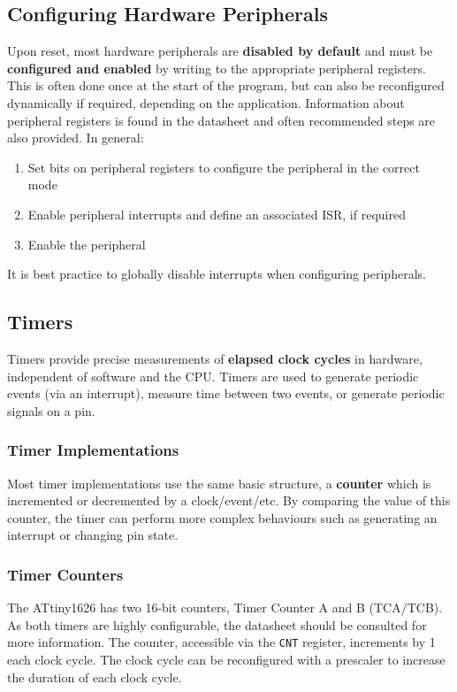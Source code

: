 \documentclass{article}
\begin{document}
\subsection{Configuring Hardware Peripherals}
Upon reset, most hardware peripherals are \textbf{disabled by default}
and must be \textbf{configured and enabled} by writing to the
appropriate peripheral registers. This is often done once at the start
of the program, but can also be reconfigured dynamically if required,
depending on the application. Information about peripheral registers is
found in the datasheet and often recommended steps are also provided.
In general:
\begin{enumerate}
    \item Set bits on peripheral registers to configure the peripheral
          in the correct mode
    \item Enable peripheral interrupts and define an associated ISR, if
          required
    \item Enable the peripheral
\end{enumerate}
It is best practice to globally disable interrupts when configuring
peripherals.
\subsection{Timers}
Timers provide precise measurements of \textbf{elapsed clock cycles} in
hardware, independent of software and the CPU\@. Timers are used to
generate periodic events (via an interrupt), measure time between two
events, or generate periodic signals on a pin.
\subsubsection{Timer Implementations}
Most timer implementations use the same basic structure, a
\textbf{counter} which is incremented or decremented by a
clock/event/etc. By comparing the value of this counter, the timer can
perform more complex behaviours such as generating an interrupt or
changing pin state.
\subsubsection{Timer Counters}
The ATtiny1626 has two 16-bit counters, Timer Counter A and B
(TCA/TCB). As both timers are highly configurable, the datasheet should
be consulted for more information. The counter, accessible via the
\texttt{CNT} register, increments by 1 each clock cycle. The
clock cycle can be reconfigured with a prescaler to increase the
duration of each clock cycle.
\end{document}
